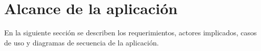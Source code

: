 \chapter{Alcance de la aplicación  } 
En la siguiente sección se describen los requerimientos, actores implicados, casos de uso y diagramas de secuencia de la aplicación.